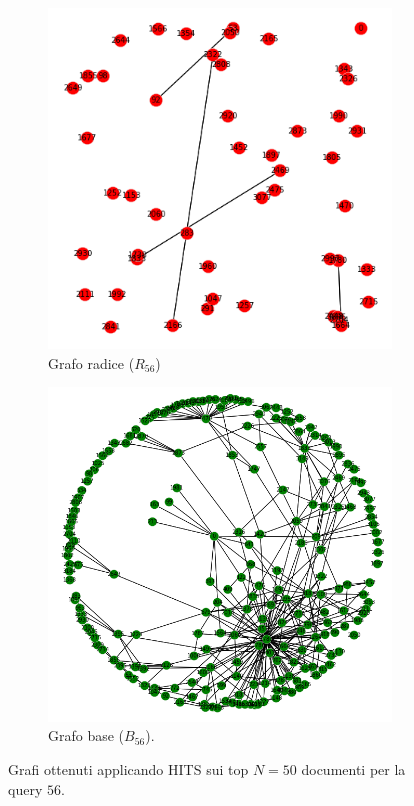 \begin{figure}
	\centering
	\begin{subfigure}{.5\textwidth}
		\centering
		\includegraphics[width=1\textwidth]{figures/R.png}
		\caption{Grafo radice ($R_{56}$)}
		\label{fig:uno}
	\end{subfigure}%
	\begin{subfigure}{.5\textwidth}
		\centering
		\includegraphics[width=1\textwidth]{figures/B.png}
		\caption{Grafo base ($B_{56}$).}
		\label{fig:due}
	\end{subfigure}
	\caption{Grafi ottenuti applicando \textsc{HITS} sui top $N=50$ documenti per la query $56$.}
	\label{fig:unodue}
\end{figure}

